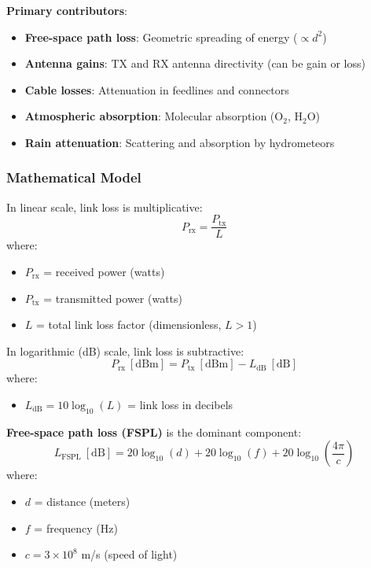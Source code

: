 \textbf{Primary contributors}:
\begin{itemize}
\item \textbf{Free-space path loss}: Geometric spreading of energy ($\propto d^2$)
\item \textbf{Antenna gains}: TX and RX antenna directivity (can be gain or loss)
\item \textbf{Cable losses}: Attenuation in feedlines and connectors
\item \textbf{Atmospheric absorption}: Molecular absorption (O$_2$, H$_2$O)
\item \textbf{Rain attenuation}: Scattering and absorption by hydrometeors
\end{itemize}

\subsubsection{Mathematical Model}

In linear scale, link loss is multiplicative:
\begin{equation}
P_{\text{rx}} = \frac{P_{\text{tx}}}{L}
\end{equation}
where:
\begin{itemize}
\item $P_{\text{rx}}$ = received power (watts)
\item $P_{\text{tx}}$ = transmitted power (watts)
\item $L$ = total link loss factor (dimensionless, $L > 1$)
\end{itemize}

In logarithmic (dB) scale, link loss is subtractive:
\begin{equation}
P_{\text{rx}}\ [\text{dBm}] = P_{\text{tx}}\ [\text{dBm}] - L_{\text{dB}}\ [\text{dB}]
\end{equation}
where:
\begin{itemize}
\item $L_{\text{dB}} = 10\log_{10}(L)$ = link loss in decibels
\end{itemize}

\textbf{Free-space path loss (FSPL)} is the dominant component:
\begin{equation}
L_{\text{FSPL}}\ [\text{dB}] = 20\log_{10}(d) + 20\log_{10}(f) + 20\log_{10}\left(\frac{4\pi}{c}\right)
\end{equation}
where:
\begin{itemize}
\item $d$ = distance (meters)
\item $f$ = frequency (Hz)
\item $c = 3 \times 10^8$ m/s (speed of light)
\end{itemize}

